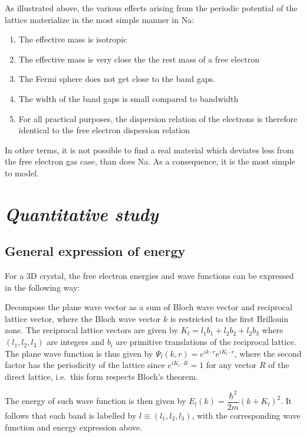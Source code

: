 \documentclass{article}
\begin{document}
    As illustrated above, the various effects arising from the periodic
potential of the lattice materialize in the most simple manner in Na:

\begin{enumerate}
\def\labelenumi{\arabic{enumi}.}
\itemsep1pt\parskip0pt
\item
  The effective mass is isotropic
\item
  The effective mass is very close the the rest mass of a free electron
\item
  The Fermi sphere does not get close to the band gaps.
\item
  The width of the band gaps is small compared to bandwidth
\item
  For all practical purposes, the dispersion relation of the electrons
  is therefore identical to the free electron dispersion relation
\end{enumerate}

In other terms, it is not possible to find a real material which
deviates less from the free electron gas case, than does Na. As a
consequence, it is the most simple to model.


    \section{\emph{Quantitative study}}



    \subsection{General expression of energy}


    For a 3D crystal, the free electron energies and wave functions can be
expressed in the following way:

Decompose the plane wave vector as a sum of Bloch wave vector and
reciprocal lattice vector, where the Bloch wave vector $k$ is restricted
to the first Brillouin zone. The reciprocal lattice vectors are given by
$K_l =l_1 b_1 + l_2 b_2 + l_2 b_3$ where $(l_1, l_2, l_3)$ are integers
and $b_i$ are primitive translations of the reciprocal lattice. The
plane wave function is thus given by
$\Psi_l(k, r)=e^{ik\cdot r}e^{iK_l\cdot r}$, where the second factor has
the periodicity of the lattice since $e^{iK_l\cdot R} = 1$ for any
vector $R$ of the direct lattice, i.e.~this form respects Bloch's
theorem.

The energy of such wave function is then given by
$E_l(k)=\dfrac{\hbar^2}{2m}(k+K_l)^2$. It follows that each band is
labelled by $l \equiv (l_1, l_2, l_3)$, with the corresponding wave
function and energy expression above.
\end{document}
